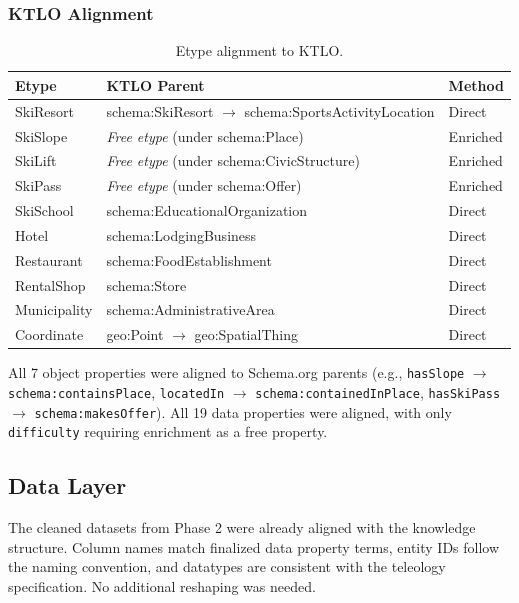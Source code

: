 \subsubsection{KTLO Alignment}

\begin{table}[h!]
\centering
\small
\begin{tabular}{|l|l|l|}
\hline
\textbf{Etype} & \textbf{KTLO Parent} & \textbf{Method} \\
\hline
SkiResort & schema:SkiResort $\rightarrow$ schema:SportsActivityLocation & Direct \\
SkiSlope & \textit{Free etype} (under schema:Place) & Enriched \\
SkiLift & \textit{Free etype} (under schema:CivicStructure) & Enriched \\
SkiPass & \textit{Free etype} (under schema:Offer) & Enriched \\
SkiSchool & schema:EducationalOrganization & Direct \\
Hotel & schema:LodgingBusiness & Direct \\
Restaurant & schema:FoodEstablishment & Direct \\
RentalShop & schema:Store & Direct \\
Municipality & schema:AdministrativeArea & Direct \\
Coordinate & geo:Point $\rightarrow$ geo:SpatialThing & Direct \\
\hline
\end{tabular}
\caption{Etype alignment to KTLO.}
\end{table}

\noindent All 7 object properties were aligned to Schema.org parents (e.g., \texttt{hasSlope} $\rightarrow$ \texttt{schema:containsPlace}, \texttt{locatedIn} $\rightarrow$ \texttt{schema:containedInPlace}, \texttt{hasSkiPass} $\rightarrow$ \texttt{schema:makesOffer}). All 19 data properties were aligned, with only \texttt{difficulty} requiring enrichment as a free property.

\subsection{Data Layer}

The cleaned datasets from Phase 2 were already aligned with the knowledge structure. Column names match finalized data property terms, entity IDs follow the naming convention, and datatypes are consistent with the teleology specification. No additional reshaping was needed.

